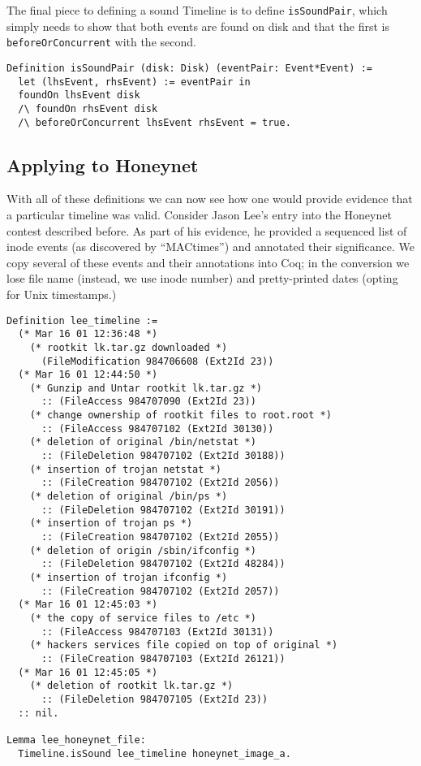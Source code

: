 \documentclass[nocopyrightspace,preprint]{sigplanconf}
\begin{document}
The final piece to defining a sound Timeline is to define {\tt isSoundPair},
which simply needs to show that both events are found on disk and that the
first is {\tt beforeOrConcurrent} with the second. 

\begin{lstlisting}
Definition isSoundPair (disk: Disk) (eventPair: Event*Event) :=
  let (lhsEvent, rhsEvent) := eventPair in
  foundOn lhsEvent disk
  /\ foundOn rhsEvent disk
  /\ beforeOrConcurrent lhsEvent rhsEvent = true.
\end{lstlisting}


\subsection{Applying to Honeynet}
With all of these definitions we can now see how one would provide evidence
that a particular timeline was valid. Consider Jason Lee's entry\cite{lee}
into the Honeynet contest described before. As part of his evidence, he
provided a sequenced list of inode events (as discovered by ``MACtimes'') and
annotated their significance. We copy several of these events and their
annotations into Coq; in the conversion we lose file name (instead, we use
inode number) and pretty-printed dates (opting for Unix timestamps.)

\begin{lstlisting}
Definition lee_timeline :=
  (* Mar 16 01 12:36:48 *)
    (* rootkit lk.tar.gz downloaded *)
      (FileModification 984706608 (Ext2Id 23))
  (* Mar 16 01 12:44:50 *)
    (* Gunzip and Untar rootkit lk.tar.gz *)
      :: (FileAccess 984707090 (Ext2Id 23))
    (* change ownership of rootkit files to root.root *)
      :: (FileAccess 984707102 (Ext2Id 30130))
    (* deletion of original /bin/netstat *)
      :: (FileDeletion 984707102 (Ext2Id 30188))
    (* insertion of trojan netstat *)
      :: (FileCreation 984707102 (Ext2Id 2056))
    (* deletion of original /bin/ps *)
      :: (FileDeletion 984707102 (Ext2Id 30191))
    (* insertion of trojan ps *)
      :: (FileCreation 984707102 (Ext2Id 2055))
    (* deletion of origin /sbin/ifconfig *)
      :: (FileDeletion 984707102 (Ext2Id 48284))
    (* insertion of trojan ifconfig *)
      :: (FileCreation 984707102 (Ext2Id 2057))
  (* Mar 16 01 12:45:03 *)
    (* the copy of service files to /etc *)
      :: (FileAccess 984707103 (Ext2Id 30131))
    (* hackers services file copied on top of original *)
      :: (FileCreation 984707103 (Ext2Id 26121))
  (* Mar 16 01 12:45:05 *)
    (* deletion of rootkit lk.tar.gz *)
      :: (FileDeletion 984707105 (Ext2Id 23))
  :: nil.

Lemma lee_honeynet_file:
  Timeline.isSound lee_timeline honeynet_image_a.
\end{lstlisting}
\end{document}
